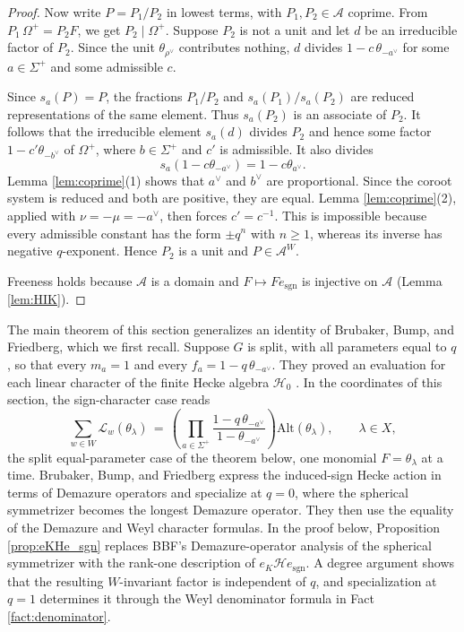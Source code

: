 \documentclass[12pt]{article}
\numberwithin{equation}{section}
\theoremstyle{definition}
\theoremstyle{remark}
\theoremstyle{plain}
\begin{document}
\begin{proof}
Now write $P = P_1/P_2$ in lowest terms, with $P_1, P_2 \in \mathcal{A}$ coprime. From $P_1\,\Omega^{+} = P_2 F$, we get $P_2 \mid \Omega^{+}$. Suppose $P_2$ is not a unit and let $d$ be an irreducible factor of $P_2$. Since the unit $\theta_{\rho^\vee}$ contributes nothing, $d$ divides $1 - c\,\theta_{-a^\vee}$ for some $a \in \Sigma^+$ and some admissible $c$.

Since $s_a(P)=P$, the fractions $P_1/P_2$ and $s_a(P_1)/s_a(P_2)$ are reduced representations of the same element. Thus $s_a(P_2)$ is an associate of $P_2$. It follows that the irreducible element $s_a(d)$ divides $P_2$ and hence some factor $1-c'\theta_{-b^\vee}$ of $\Omega^+$, where $b \in \Sigma^+$ and $c'$ is admissible. It also divides
$$s_a(1-c\theta_{-a^\vee})=1-c\theta_{a^\vee}.$$
Lemma \ref{lem:coprime}(1) shows that $a^\vee$ and $b^\vee$ are proportional. Since the coroot system is reduced and both are positive, they are equal. Lemma \ref{lem:coprime}(2), applied with $\nu=-\mu=-a^\vee$, then forces $c'=c^{-1}$. This is impossible because every admissible constant has the form $\pm q^n$ with $n\geq1$, whereas its inverse has negative $q$-exponent. Hence $P_2$ is a unit and $P \in \mathcal{A}^W$.

Freeness holds because $\mathcal{A}$ is a domain and $F \mapsto Fe_{\mathrm{sgn}}$ is injective on $\mathcal{A}$ (Lemma \ref{lem:HIK}).
\end{proof}

The main theorem of this section generalizes an identity of Brubaker, Bump, and Friedberg, which we first recall. Suppose $G$ is split, with all parameters equal to $q$, so that every $m_a = 1$ and every $f_a = 1 - q\,\theta_{-a^\vee}$. They proved an evaluation for each linear character of the finite Hecke algebra $\mathcal{H}_0$ \cite[Theorem 5]{BBF16}. In the coordinates of this section, the sign-character case reads
$$\sum_{w \in W} \mathcal{L}_{w}(\theta_\lambda) \,=\, \left(\prod_{a \in \Sigma^+} \frac{1 - q\,\theta_{-a^\vee}}{1 - \theta_{-a^\vee}}\right) \mathrm{Alt}(\theta_\lambda), \qquad \lambda \in X,$$
the split equal-parameter case of the theorem below, one monomial $F = \theta_\lambda$ at a time. Brubaker, Bump, and Friedberg express the induced-sign Hecke action in terms of Demazure operators and specialize at $q=0$, where the spherical symmetrizer becomes the longest Demazure operator. They then use the equality of the Demazure and Weyl character formulas. In the proof below, Proposition \ref{prop:eKHe_sgn} replaces BBF's Demazure-operator analysis of the spherical symmetrizer with the rank-one description of $e_K\mathcal H e_{\mathrm{sgn}}$. A degree argument shows that the resulting $W$-invariant factor is independent of $q$, and specialization at $q=1$ determines it through the Weyl denominator formula in Fact \ref{fact:denominator}.
\end{document}
